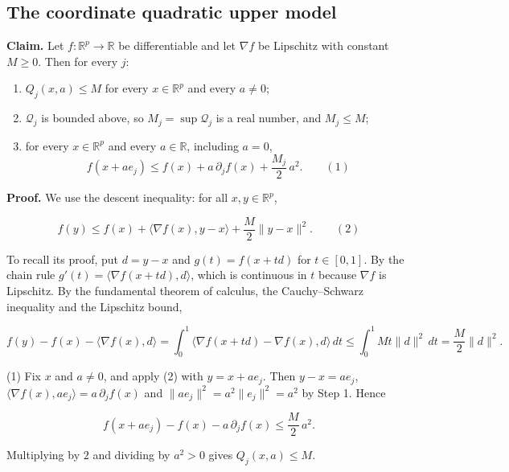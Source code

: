 \documentclass[11pt,a4paper]{report}
\begin{document}
\subsection{\texorpdfstring{The coordinate quadratic upper model}{The coordinate quadratic upper model}}
\label{report-step-AverageLMC-Assumptions-lean-3}


\textbf{Claim.} Let \(f:\mathbb R^p\to\mathbb R\) be differentiable and let \(\nabla f\) be Lipschitz with constant \(M\ge0\). Then for every \(j\):



\begin{enumerate}


\item \(Q_j(x,a)\le M\) for every \(x\in\mathbb R^p\) and every \(a\ne0\);

\item \(\mathcal Q_j\) is bounded above, so \(M_j=\sup\mathcal Q_j\) is a real number, and \(M_j\le M\);

\item for every \(x\in\mathbb R^p\) and every \(a\in\mathbb R\), including \(a=0\),
\[f(x+ae_j)\le f(x)+a\,\partial_jf(x)+\frac{M_j}{2}\,a^2.\qquad(1)\]

\end{enumerate}



\textbf{Proof.} We use the descent inequality: for all \(x,y\in\mathbb R^p\),


\[f(y)\le f(x)+\langle\nabla f(x),y-x\rangle+\frac M2\|y-x\|^2.\qquad(2)\]


To recall its proof, put \(d=y-x\) and \(g(t)=f(x+td)\) for \(t\in[0,1]\). By the chain rule \(g'(t)=\langle\nabla f(x+td),d\rangle\), which is continuous in \(t\) because \(\nabla f\) is Lipschitz. By the fundamental theorem of calculus, the Cauchy–Schwarz inequality and the Lipschitz bound,


\[f(y)-f(x)-\langle\nabla f(x),d\rangle=\int_0^1\langle\nabla f(x+td)-\nabla f(x),d\rangle\,dt\le\int_0^1Mt\|d\|^2\,dt=\frac M2\|d\|^2.\]


(1) Fix \(x\) and \(a\ne0\), and apply (2) with \(y=x+ae_j\). Then \(y-x=ae_j\), \(\langle\nabla f(x),ae_j\rangle=a\,\partial_jf(x)\) and \(\|ae_j\|^2=a^2\|e_j\|^2=a^2\) by Step 1. Hence


\[f(x+ae_j)-f(x)-a\,\partial_jf(x)\le\frac M2\,a^2.\]


Multiplying by \(2\) and dividing by \(a^2>0\) gives \(Q_j(x,a)\le M\).
\end{document}
